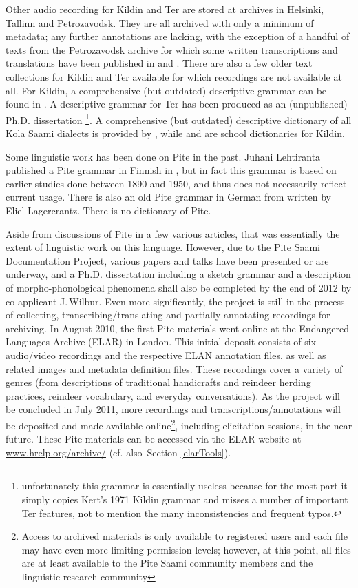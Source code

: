 \documentclass[a4paper,12pt]{article}
\begin{document}
Other audio recording for Kildin and Ter are stored at archives in Helsinki, Tallinn and Petrozavodsk. They are all archived with only a minimum of metadata; any further annotations are lacking, with the exception of a handful of texts from the Petrozavodsk archive for which some written transcriptions and translations have been published in \citealt{kert1961} and \citealt{panfilov-etal1988}. There are also a few older text collections for Kildin and Ter available for which recordings are not available at all. For Kildin, a comprehensive (but outdated) descriptive grammar can be found in \citealt{kert1971}. A descriptive grammar for Ter has been produced as an (unpublished) Ph.D. dissertation \cite{tereskin2002a}\footnote{unfortunately this grammar is essentially useless because for the most part it simply copies Kert's 1971 Kildin grammar and misses a number of important Ter features, not to mention the many inconsistencies and frequent typos.}. A comprehensive (but outdated) descriptive dictionary of all Kola Saami dialects is provided by \citealt{itkonen_t_i1958a}, while \citealt{kuruc-etal1985} and \citealt{kert1986} are school dictionaries for Kildin.

Some linguistic work has been done on Pite in the past. Juhani Lehtiranta published a Pite grammar in Finnish in \citeyear{lehtiranta1992}, but in fact this grammar is based on earlier studies done between 1890 and 1950, and thus does not necessarily reflect current usage. There is also an old Pite grammar in German from \citeyear{lagercrantz1926} written by Eliel Lagercrantz. There is no dictionary of Pite.

Aside from discussions of Pite in a few various articles, that was essentially the extent of linguistic work on this language. However, due to the Pite Saami Documentation Project, various papers and talks have been presented or are underway, and a Ph.D. dissertation including a sketch grammar and a description of morpho-phonological phenomena shall also be completed by the end of 2012 by co-applicant J.\,Wilbur. Even more significantly, the project is still in the process of collecting, transcribing/translating and partially annotating recordings for archiving. In August 2010, the first Pite materials went online at the Endangered Languages Archive (ELAR) in London. This initial deposit consists of six audio/video recordings and the respective ELAN annotation files, as well as related images and metadata definition files. These recordings cover a variety of genres (from descriptions of traditional handicrafts and reindeer herding practices, reindeer vocabulary, and everyday conversations). As the project will be concluded in July 2011, more recordings and transcriptions/annotations will be deposited and made available online\footnote{Access to archived materials is only available to registered users and each file may have even more limiting permission levels; however, at this point, all files are at least available to the Pite Saami community members and the linguistic research community}, including elicitation sessions, in the near future. These Pite materials can be accessed via the ELAR website at \url{www.hrelp.org/archive/} (cf. also~Section \ref{elarTools}).
\end{document}
